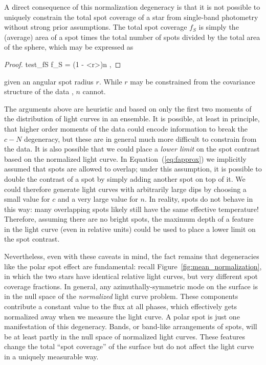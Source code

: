 \documentclass[modern]{aastex62}
\begin{document}
A direct consequence of this normalization degeneracy is that it is not
possible to uniquely constrain the total spot coverage of a star from
single-band photometry without strong prior assumptions.
The total spot coverage $f_S$
is simply the (average) area of a spot
times the total number of spots divided by the total area of the sphere, which
may be expressed as
%
\begin{proof}{test_fS}
    \label{eq:fS}
    f_S = \left(1 - \left<\cos r\right>\right)n
    \quad,
\end{proof}
%
given an angular spot radius $r$.
While $r$ may be constrained from the covariance structure of the data
, $n$ cannot.

The arguments above are heuristic and based on only the first two moments
of the distribution of light curves in an ensemble.
It is possible, at least in principle, that higher order moments of the data
could encode information to
break the $c-N$ degeneracy, but these are in general much more difficult
to constrain from the data. It is also possible that we could place a
\emph{lower limit} on the spot contrast based on the normalized light
curve. In Equation~(\ref{eq:fapprox}) we implicitly assumed that
spots are allowed to overlap; under this assumption, it is possible to
double the contrast of a spot by simply adding another spot on top
of it. We could therefore generate light curves with arbitrarily
large dips by choosing a small value for $c$ and a very large value for $n$.
In reality, spots do not behave in this way: many overlapping spots
likely still have the same effective temperature! Therefore,
assuming there are no bright spots,
the maximum depth of a feature in the light curve (even in relative units)
could be used to place a lower limit on the spot contrast.

Nevertheless, even with these caveats in mind, the fact remains
that degeneracies like the polar spot effect are fundamental: recall
Figure~\ref{fig:mean_normalization}, in which the two stars
have identical relative light curves, but very different spot coverage
fractions. In general, any azimuthally-symmetric mode on the surface
is in the null space of the \emph{normalized} light curve problem. These
components contribute a constant value to the flux at all phases, which
effectively gets normalized away when we measure the light curve. A
polar spot is just one manifestation of this degeneracy. Bands, or
band-like arrangements of spots, will be at least partly in the null
space of normalized light curves. These features change the total ``spot coverage''
of the surface but do not affect the light curve in a uniquely measurable
way.
\end{document}

